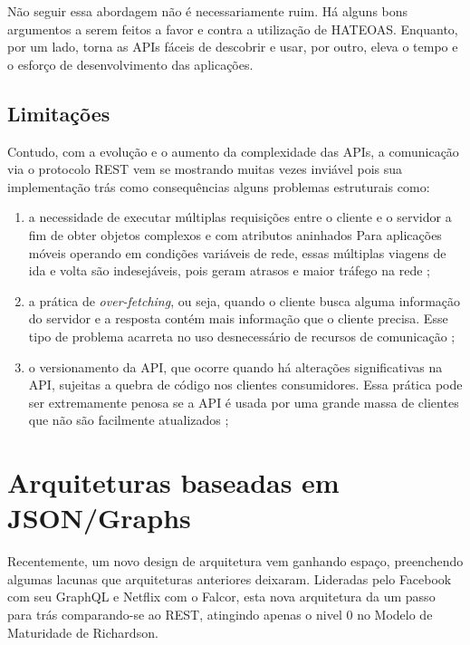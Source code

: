 Não seguir essa abordagem não é necessariamente ruim. Há alguns bons argumentos a serem feitos a favor e contra a utilização de HATEOAS. Enquanto, por um lado, torna as APIs fáceis de descobrir e usar, por outro, eleva o tempo e o esforço de desenvolvimento das aplicações.

\subsection{Limitações}

Contudo, com a evolução e o aumento da complexidade das APIs, a comunicação via o protocolo REST vem se mostrando muitas vezes inviável pois sua implementação trás como consequências alguns problemas estruturais como:

\begin{enumerate}[label=\alph*)]

\item a necessidade de executar múltiplas requisições entre o cliente e o servidor a fim de obter objetos complexos e com atributos aninhados  Para aplicações móveis operando em condições variáveis de rede, essas múltiplas viagens de ida e volta são indesejáveis, pois geram atrasos e maior tráfego na rede \cite{graphQl-overview};

\item a prática de \textit{over-fetching}, ou seja, quando o cliente busca alguma informação do servidor e a resposta contém mais informação que o cliente precisa. Esse tipo de problema acarreta no uso desnecessário de recursos de comunicação  \cite{efficient-data-communication};

\item o versionamento da API, que ocorre quando há alterações significativas na API, sujeitas a quebra de código nos clientes consumidores. Essa prática pode ser extremamente penosa se a API é usada por uma grande massa de clientes que não são facilmente atualizados \cite{api-versioning};

\end{enumerate}

\section{Arquiteturas baseadas em JSON/Graphs}\label{sec:graph}

Recentemente, um novo design de arquitetura vem ganhando espaço, preenchendo algumas lacunas que arquiteturas anteriores deixaram. Lideradas pelo Facebook com seu GraphQL e Netflix com o Falcor, esta nova arquitetura da um passo para trás comparando-se ao REST, atingindo apenas o nivel 0 no Modelo de Maturidade de Richardson. 

